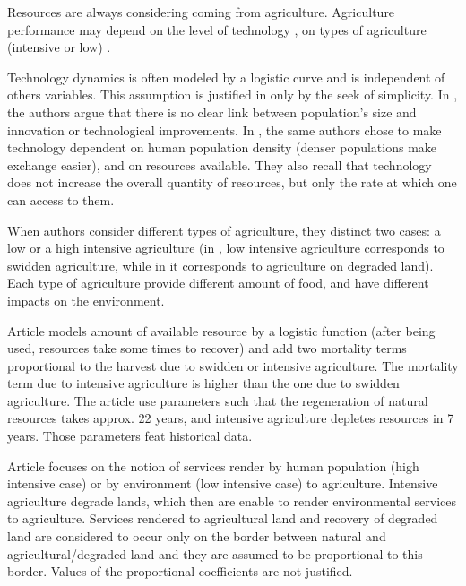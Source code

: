 \documentclass{article}
\begin{document}
\medskip
Resources are always considering coming from agriculture. Agriculture performance may depend on the level of technology \cite{henderson_ecological_2019, lafuite_time-delayed_2017, bengochea_paz_agricultural_2020}, 
on types of agriculture (intensive or low) \cite{roman_dynamics_2018, bengochea_paz_agricultural_2020}.

Technology dynamics is often modeled by a logistic curve and is independent of others variables. This assumption is justified in \cite{lafuite_time-delayed_2017} only by the seek of simplicity. In \cite{henderson_ecological_2019}, the authors argue that there is no clear link between population's size and innovation or technological improvements. In \cite{henderson_unequal_2021}, the same authors chose to make technology dependent on human population density (denser populations make exchange easier), and on resources available. They also recall that technology does not increase the overall quantity of resources, but only the rate at which one can access to them.

When authors consider different types of agriculture, they distinct two cases: a low or a high intensive agriculture (in \cite{roman_dynamics_2018}, low intensive agriculture corresponds to swidden agriculture, while in \cite{bengochea_paz_agricultural_2020} it corresponds to agriculture on degraded land). Each type of agriculture provide different amount of food, and have different impacts on the environment. 

Article \cite{roman_dynamics_2018} models amount of available resource by a logistic function (after being used, resources take some times to recover) and add two mortality terms proportional to the harvest due to swidden or intensive agriculture. The mortality term due to intensive agriculture is higher than the one due to swidden agriculture. The article use parameters such that the regeneration of natural resources takes approx. 22 years, and intensive agriculture depletes resources in 7 years. Those parameters feat historical data.

Article \cite{bengochea_paz_agricultural_2020} focuses on the notion of services render by human population (high intensive case) or by environment (low intensive case) to agriculture. Intensive agriculture degrade lands, which then are enable to render environmental services to agriculture. Services rendered to agricultural land and recovery of degraded land are considered to occur only on the border between natural and agricultural/degraded land and they are assumed to be proportional to this border. Values of the proportional coefficients are not justified.
\end{document}
